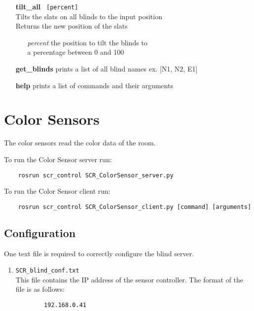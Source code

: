 \documentclass[twoside]{article}
\begin{document}
\begin{enumerate}
		\item[\bf tilt\_all]\verb| [percent]|\\
		Tilts the slats on all blinds to the input position\\
		Returns the new position of the slats
		
		\begin{enumerate}[leftmargin=3\parindent]
			\item[\it percent] the position to tilt the blinds to\\
			a percentage between 0 and 100
		\end{enumerate}
		
		\item[\bf get\_blinds] prints a list of all blind names ex. [N1, N2, E1]
		
		\item[\bf help] prints a list of commands and their arguments
		\end{enumerate}
	
	\section{Color Sensors}
	The color sensors read the color data of the room.
	
	To run the Color Sensor server run:
	\begin{verbatim}
	rosrun scr_control SCR_ColorSensor_server.py
	\end{verbatim}
	
	To run the Color Sensor client run:
	\begin{verbatim}
	rosrun scr_control SCR_ColorSensor_client.py [command] [arguments]
	\end{verbatim}
	
	\subsection{Configuration}
	One text file is required to correctly configure the blind server.
	
	\begin{enumerate}
		\item \verb|SCR_blind_conf.txt|\\
		This file contains the IP address of the sensor controller. The format of the file is as follows:
		
		\begin{verbatim}
		192.168.0.41
		\end{verbatim}
	
	\end{enumerate}
	
\end{document}
